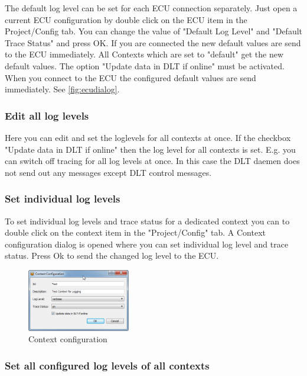 \documentclass[a4paper,11pt]{article}
\begin{document}
The default log level can be set for each ECU connection separately. Just open a current ECU
configuration by double click on the ECU item in the Project/Config tab.
You can change the value of "Default Log Level" and "Default Trace Status" and press OK.
If you are connected the new default values are send to the ECU immediately. All Contexts
which are set to "default" get the new default values. The option "Update data in DLT if online"
must be activated.
When you connect to the ECU the configured default values are send immediately.
See \autoref{fig:ecudialog}.

\subsubsection{Edit all log levels}

Here you can edit and set the loglevels for all contexts at once.
If the checkbox "Update data in DLT if online" then the log level for all contexts is set.
E.g. you can switch off tracing for all log levels at once. In this case the DLT daemen does not send out
any messages except DLT control messages.


\subsubsection{Set individual log levels}

To set individual log levels and trace status for a dedicated context you can to double click on the context item in the
"Project/Config" tab. A Context configuration dialog is opened where you can set individual
log level and trace status. Press Ok to send the changed log level to the ECU.

\begin{figure}[H]
 \centering
  \includegraphics[width=0.4\textwidth]{images/contextconfiguration.png}
 \caption{Context configuration}
 \label{fig:contextconfiguration}
\end{figure}


\subsubsection{Set all configured log levels of all contexts}
\end{document}
